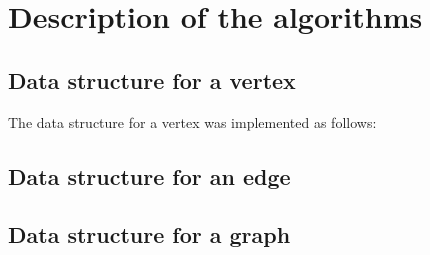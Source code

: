 \section{Description of the algorithms}

\subsection*{Data structure for a vertex}
The data structure for a vertex was implemented as follows:
\subsection*{Data structure for an edge}
\subsection*{Data structure for a graph}
